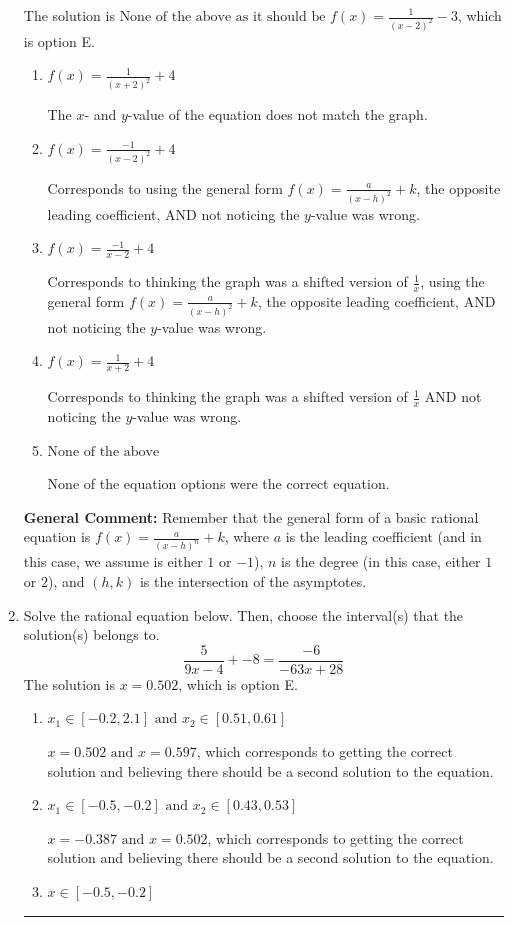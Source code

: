 \documentclass{extbook}[14pt]
\newcommand{\litem}[1]{\item #1

\rule{\textwidth}{0.4pt}}
\begin{document}
\begin{enumerate}
{The solution is \( \text{None of the above as it should be } f(x) = \frac{1}{(x - 2)^2} - 3 \), which is option E.\begin{enumerate}[label=\Alph*.]
\item \( f(x) = \frac{1}{(x + 2)^2} + 4 \)

The $x$- and $y$-value of the equation does not match the graph.
\item \( f(x) = \frac{-1}{(x - 2)^2} + 4 \)

Corresponds to using the general form $f(x) = \frac{a}{(x-h)^2}+k$, the opposite leading coefficient, AND not noticing the $y$-value was wrong.
\item \( f(x) = \frac{-1}{x - 2} + 4 \)

Corresponds to thinking the graph was a shifted version of $\frac{1}{x}$, using the general form $f(x) = \frac{a}{(x-h)^2}+k$, the opposite leading coefficient, AND not noticing the $y$-value was wrong.
\item \( f(x) = \frac{1}{x + 2} + 4 \)

Corresponds to thinking the graph was a shifted version of $\frac{1}{x}$ AND not noticing the $y$-value was wrong.
\item \( \text{None of the above} \)

None of the equation options were the correct equation.
\end{enumerate}

\textbf{General Comment:} Remember that the general form of a basic rational equation is $ f(x) = \frac{a}{(x-h)^n} + k$, where $a$ is the leading coefficient (and in this case, we assume is either $1$ or $-1$), $n$ is the degree (in this case, either $1$ or $2$), and $(h, k)$ is the intersection of the asymptotes.
}
\litem{
Solve the rational equation below. Then, choose the interval(s) that the solution(s) belongs to.
\[ \frac{5}{9x -4} + -8 = \frac{-6}{-63x + 28} \]The solution is \( x = 0.502 \), which is option E.\begin{enumerate}[label=\Alph*.]
\item \( x_1 \in [-0.2, 2.1] \text{ and } x_2 \in [0.51,0.61] \)

$x = 0.502 \text{ and } x = 0.597$, which corresponds to getting the correct solution and believing there should be a second solution to the equation.
\item \( x_1 \in [-0.5, -0.2] \text{ and } x_2 \in [0.43,0.53] \)

$x = -0.387 \text{ and } x = 0.502$, which corresponds to getting the correct solution and believing there should be a second solution to the equation.
\item \( x \in [-0.5,-0.2] \)


\end{enumerate}}
\end{enumerate}
\end{document}
